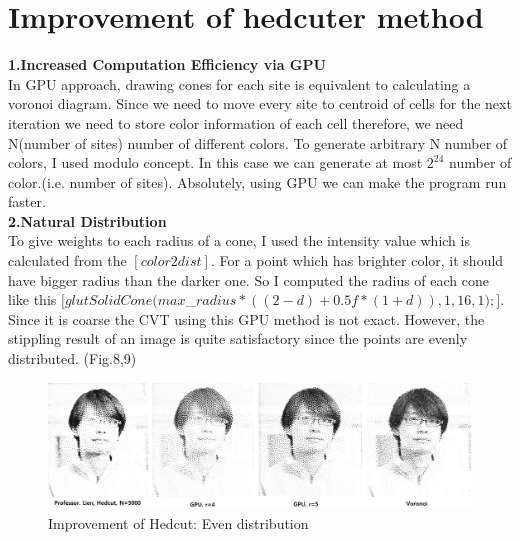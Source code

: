 \documentclass[11pt]{article}
\begin{document}
\section{Improvement of hedcuter method}
\textbf{1.Increased Computation Efficiency via GPU}\\
In GPU approach, drawing cones for each site is equivalent to calculating a voronoi diagram. Since we need to move every site to centroid of cells for the next iteration we need to store color information of each cell  therefore, we need N(number of sites) number of different colors. To generate arbitrary N number of colors, I used modulo concept. In this case we can generate at most $2^{24}$ number of color.(i.e. number of sites). Absolutely, using GPU we can make the program run faster.\\


\textbf{2.Natural Distribution\\}
To give weights to each radius of a cone, I used the intensity value which is calculated from the $[color2dist]$. For a point which has brighter color, it should have bigger radius than the darker one. So I computed the radius of each cone like this $[glutSolidCone(max$\_$radius*((2 - d)+0.5f*(1+d)), 1, 16, 1);]$. Since it is coarse the CVT using this GPU method is not exact. However, the stippling result of an image is quite satisfactory since the points are evenly distributed. (Fig.8,9)
\begin{figure}[h]
  \includegraphics[width=160mm]{compare(prof).jpg}
  \caption{Improvement of Hedcut: Even distribution}\label{compare1h}
\end{figure}
\end{document}
